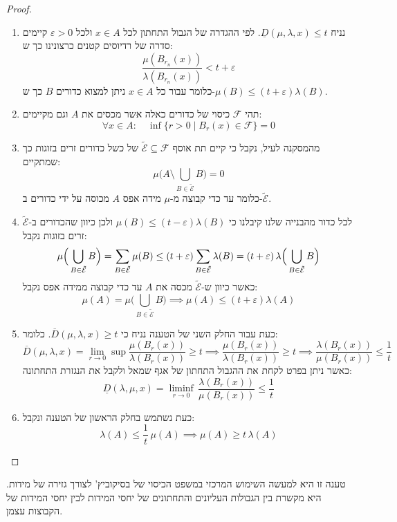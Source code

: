 \documentclass{tstextbook}
\begin{document}
\begin{proof}
  \begin{enumerate}
    \item נניח \(\underline{D}(\mu, \lambda, x) \leq t\). לפי ההגדרה של הגבול התחתון לכל \(x \in A\) ולכל \(\varepsilon>0\) קיימים סדרה של רדיוסים קטנים כרצונינו כך ש: 
$$\frac{\mu(B_{r_{n}}(x))}{\lambda(B_{r_{n}}(x))}<t+\varepsilon$$
כלומר עבור כל \(x \in A\) ניתן למצוא כדורים \(B\) כך ש-\(\mu(B)\leq \left( t+\varepsilon \right)\lambda(B)\).


    \item תהי \(\mathcal{F}\) כיסוי של כדורים כאלה אשר מכסים את \(A\) וגם מקיימים: 
$$\forall x\in A:\quad\operatorname*{inf}\{r>0\mid B_{r}(x)\in{\mathcal{F}}\}=0$$


    \item מהמסקנה לעיל, נקבל כי קיים תת אוסף \(\widetilde{\mathcal{E}}\subseteq \mathcal{F}\) של כשל כדורים זרים בזוגות כך שמתקיים: 
$$\mu{\Big(}A\setminus\bigcup_{B\in{\tilde{\mathcal{E}}}}B{\Big)}=0$$
כלומר עד כדי קבוצה מ-\(\mu\) מידה אפס \(A\) מכוסה על ידי כדורים ב-\(\widetilde{\mathcal{E}}\).


    \item לכל כדור מהבנייה שלנו קיבלנו כי \(\mu(B)\leq \left( t-\varepsilon \right)\lambda(B)\) ולכן כיוון שהכדורים ב-\(\widetilde{\mathcal{E}}\) זרים בזוגות נקבל: 
$$\mu{\Bigl(}\bigcup_{B\in{\tilde{\mathcal{E}}}}B{\Bigr)}=\sum_{B\in{\tilde{\mathcal{E}}}}\mu(B)\leq(t+\varepsilon)\sum_{B\in{\tilde{\mathcal{E}}}}\lambda(B)=(t+\varepsilon)\,\lambda{\Bigl(}\bigcup_{B\in{\tilde{\mathcal{E}}}}B{\Bigr)}$$
כאשר כיוון ש-\(\widetilde{\mathcal{E}}\) מכסה את \(A\) עד כדי קבוצה ממידה אפס נקבל:
$$\mu(A)=\mu\Big(\bigcup_{B\in\tilde{\mathcal{E}}}B\Big)\implies\mu(A)\leq\left(t+\varepsilon\right)\lambda(A)$$


    \item כעת עבור החלק השני של הטענה נניח כי \(\overline{D}(\mu, \lambda, x) \geq t\).  כלומר: 
$$\overline{{{D}}}\left( \mu,\lambda,x \right)=\operatorname*{lim}_{r\to0}\operatorname*{sup}{\frac{\mu(B_{r}(x))}{\lambda(B_{r}(x))}}\geq t\implies \frac{\mu(B_{r}(x))}{\lambda(B_{r}(x))}\geq t\implies\frac{\lambda(B_{r}(x))}{\mu(B_{r}(x))}\leq\frac{1}{t}$$
כאשר ניתן בפרט לקחת את ההגבול התחתון של אגף שמאל ולקבל את הנגזרת התחתונה:
$$\underline{{{D}}}(\lambda,\mu,x)=\operatorname*{liminf}_{r\to0}\,\frac{\lambda(B_{r}(x))}{\mu(B_{r}(x))}\leq\frac{1}{t}$$


    \item כעת נשתמש בחלק הראשון של הטענה ונקבל: 
$$\lambda(A)\leq\frac{1}{t}\,\mu(A)\implies\mu(A)\geq t\,\lambda(A)$$


  \end{enumerate}
\end{proof}
\begin{remark}
טענה זו היא למעשה השימוש המרכזי במשפט הכיסוי של בסיקוביץ' לצורך גזירה של מידות. היא מקשרת בין הגבולות העליונים והתחתונים של יחסי המידות לבין יחסי המידות של הקבוצות עצמן.

\end{remark}
\end{document}
